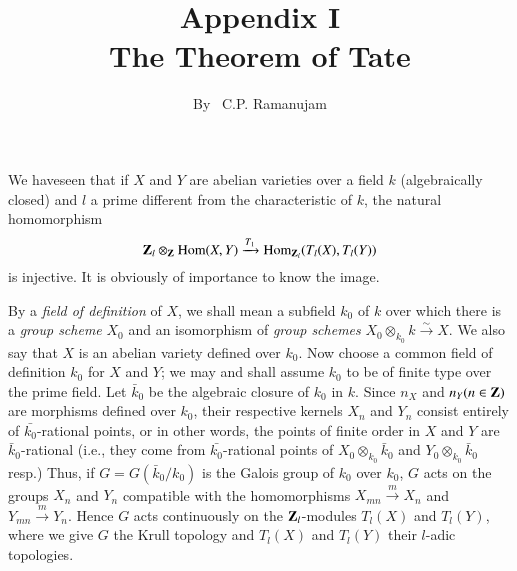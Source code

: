 \title{Appendix I \\The Theorem of Tate}\label{apen1}

\author{By~ C.P. Ramanujam}

\date{}
\maketitle

\setcounter{page}{169}
\setcounter{pageoriginal}{133}
We have\pageoriginale seen that if $X$ and $Y$ are abelian varieties over a field $k$ (algebraically closed) and $l$ a prime different from the characteristic of $k$, the natural homomorphism
\begin{equation}
\mathbf{Z}_l \otimes_{\mathbf{Z}} \operatorname{Hom} (X,Y) \xrightarrow{T_1} \operatorname{Hom}_{\mathbf{Z}_l} (T_l (X), T_l (Y)) \label{apen1-eq1}
\end{equation}
is injective. It is obviously of importance to know the image.

By a {\em field of definition} of $X$, we shall mean a subfield $k_0$ of $k$ over which there is a {\em group scheme} $X_0$ and an isomorphism of {\em group schemes} $X_0 \otimes_{k_0} k \xrightarrow{\sim} X$. We also say that $X$ is an abelian variety defined over $k_0$. Now choose a common field of definition $k_0$ for $X$ and $Y$; we may and shall assume $k_0$ to be of finite type over the prime field. Let $\bar{k}_0$ be the algebraic closure of $k_0$ in $k$. Since $n_X$ and $n_Y (n \in \mathbf{Z})$ are morphisms defined over $k_0$, their respective kernels $X_n$ and $Y_n$ consist entirely of $\bar{k_0}$-rational points, or in other words, the points of finite order in $X$ and $Y$ are $\bar{k}_0$-rational (i.e., they come from $\bar{k_0}$-rational points of $X_0 \otimes_{k_0} \bar{k}_0$ and $Y_0 \otimes_{k_0} \bar{k}_0$ resp.) Thus, if $G = G (\bar{k}_0/k_0)$ is the Galois group of $k_0$ over $k_0$, $G$ acts on the groups $X_n$ and $Y_n$ compatible with the homomorphisms $X_{mn} \xrightarrow{m} X_n$ and $Y_{mn} \xrightarrow{m} Y_n$. Hence $G$ acts continuously on the $\mathbf{Z}_l$-modules $T_l(X)$ and $T_l (Y)$, where we give $G$ the Krull topology and $T_l(X)$ and $T_l(Y)$ their $l$-adic topologies.

